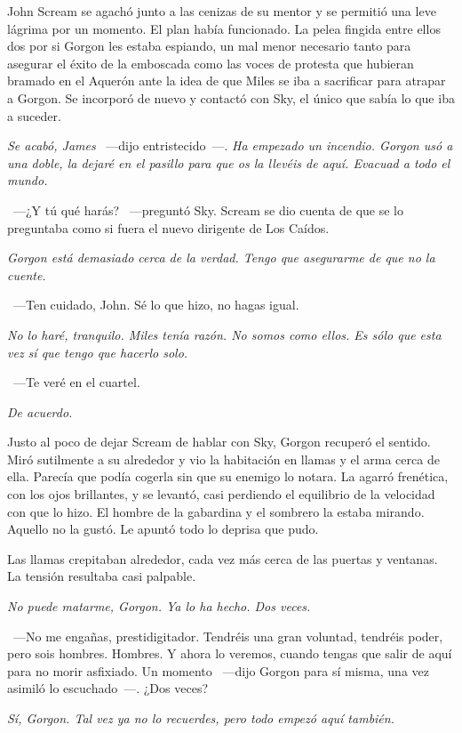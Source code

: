 John Scream se agachó junto a las cenizas de su mentor y se permitió una leve lágrima por un momento. El plan había funcionado. La pelea fingida entre ellos dos por si Gorgon les estaba espiando, un mal menor necesario tanto para asegurar el éxito de la emboscada como las voces de protesta que hubieran bramado en el Aquerón ante la idea de que Miles se iba a sacrificar para atrapar a Gorgon. Se incorporó de nuevo y contactó con Sky, el único que sabía lo que iba a suceder.

\emph{Se acabó, James} ~---dijo entristecido~---. \emph{Ha empezado un incendio. Gorgon usó a una doble, la dejaré en el pasillo para que os la llevéis de aquí. Evacuad a todo el mundo.}

~---¿Y tú qué harás? ~---preguntó Sky. Scream se dio cuenta de que se lo preguntaba como si fuera el nuevo dirigente de Los Caídos.

\emph{Gorgon está demasiado cerca de la verdad. Tengo que asegurarme de que no la cuente.}

~---Ten cuidado, John. Sé lo que hizo, no hagas igual.

\emph{No lo haré, tranquilo. Miles tenía razón. No somos como ellos. Es sólo que esta vez sí que tengo que hacerlo solo.}

~---Te veré en el cuartel.

\emph{De acuerdo.}

\parbreak
Justo al poco de dejar Scream de hablar con Sky, Gorgon recuperó el sentido. Miró sutilmente a su alrededor y vio la habitación en llamas y el arma cerca de ella. Parecía que podía cogerla sin que su enemigo lo notara. La agarró frenética, con los ojos brillantes, y se levantó, casi perdiendo el equilibrio de la velocidad con que lo hizo. El hombre de la gabardina y el sombrero la estaba mirando. Aquello no la gustó. Le apuntó todo lo deprisa que pudo.

Las llamas crepitaban alrededor, cada vez más cerca de las puertas y ventanas. La tensión resultaba casi palpable.

\emph{No puede matarme, Gorgon. Ya lo ha hecho. Dos veces.}

~---No me engañas, prestidigitador. Tendréis una gran voluntad, tendréis poder, pero sois hombres. Hombres. Y ahora lo veremos, cuando tengas que salir de aquí para no morir asfixiado. Un momento ~---dijo Gorgon para sí misma, una vez asimiló lo escuchado~---. ¿Dos veces?

\emph{Sí, Gorgon. Tal vez ya no lo recuerdes, pero todo empezó aquí también.}

